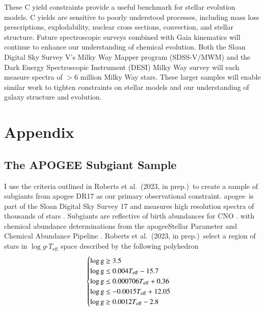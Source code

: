 \documentclass[12pt,oneside,letterpaper]{report}
\newcommand{\apogee}{\gls{apogee}}
\newcommand{\citetjack}{Roberts et al.~(2023, in prep.)}
\begin{document}
These C yield constraints provide a useful benchmark for stellar evolution models. C yields are sensitive to poorly understood processes, including mass loss prescriptions, explodability, nuclear cross sections, convection, and stellar structure. Future spectroscopic surveys combined with Gaia kinematics \citep{gaia} will continue to enhance our understanding of chemical evolution. Both the Sloan Digital Sky Survey V's Milky Way Mapper program (SDSS-V/MWM) \citep{sdssv} and the Dark Energy Spectroscopic Instrument (DESI) Milky Way survey \citep{desi, desi:mw} will each measure spectra of $>6$ million Milky Way stars. These larger samples will enable similar work to tighten constraints on stellar models and our understanding of galaxy structure and evolution.



\newpage

 



\appendix
\chapter*{Appendix}
\renewcommand{\thesection}{A.\arabic{section}}
\renewcommand\thefigure{A\arabic{figure}}    
\renewcommand\theequation{A\arabic{equation}}    
\setcounter{figure}{0}
\setcounter{equation}{0}



\section{The APOGEE Subgiant Sample}\label{sec:jack}

I use the criteria outlined in \citetjack~to create a sample of subgiants from \apogee{} DR17 \cite{apogee17} as our primary observational constraint. \apogee\ is part of the Sloan Digital Sky Survey 17 and measures high resolution spectra of thousands of stars \cite{sdss17}. Subgiants are reflective of birth abundances for CNO \citep{souto19}. with chemical abundance determinations from the \apogee Stellar Parameter and Chemical Abundance Pipeline \citep{aspcap}. 
\citetjack~select a region of stars in $\log g$-$T_\text{eff}$ space described by the following polyhedron
\begin{equation}
    \begin{cases} \label{eq:subgiant_selection}
        \log \text{g} \geq 3.5 \\
        \log \text{g} \leq 0.004T_{\rm eff} - 15.7 \\
        \log \text{g} \leq 0.000706T_{\rm eff} + 0.36 \\
        \log \text{g} \leq -0.0015T_{\rm eff} + 12.05 \\
        \log \text{g} \geq 0.0012T_{\rm eff} - 2.8 \\
    \end{cases}
\end{equation}
\end{document}
